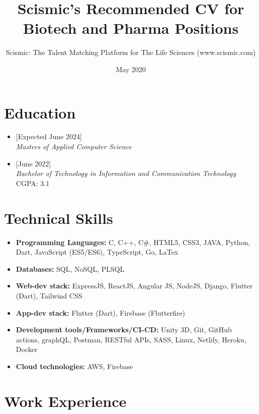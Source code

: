 \documentclass{article}
\title{Scismic's Recommended CV for Biotech and Pharma Positions}
\author{Scismic: The Talent Matching Platform for The Life Sciences (www.scismic.com)}
\date{May 2020}
\begin{document}

\makecvtitle %

\section{Education}
\begin{itemize}

\item
{}[Expected June 2024]
\\\textit{Masters of Applied Computer Science}
\item
{}[June 2022]
\\\textit{Bachelor of Technology in Information and Communication Technology}
\\
CGPA: 3.1

\end{itemize}
 
\section{Technical Skills}

\begin{itemize}
\item \textbf{Programming Languages:} C, C++, C\#, HTML5, CSS3, JAVA, Python, Dart, JavaScript (ES5/ES6), TypeScript, Go, LaTex
\item \textbf{Databases:} SQL, NoSQL, PLSQL
\item \textbf{Web-dev stack:} ExpressJS, ReactJS, Angular JS, NodeJS, Django, Flutter (Dart), Tailwind CSS
\item \textbf{App-dev stack:} Flutter (Dart), Firebase (Flutterfire)
\item \textbf{Development tools/Frameworks/CI-CD:} Unity 3D, Git, GitHub actions, graphQL, Postman, RESTful APIs, SASS, Linux, Netlify, Heroku, Docker
\item \textbf{Cloud technologies:} AWS, Firebase

\end{itemize}

\section{Work Experience}
\end{document}
